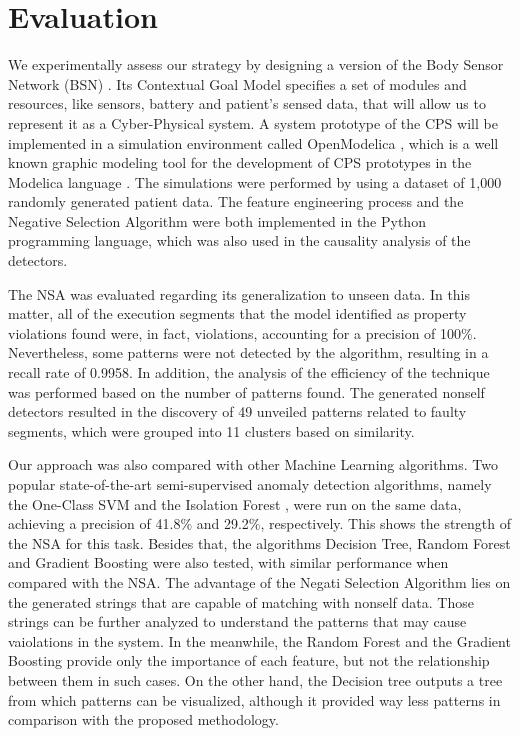 \section{Evaluation}

We experimentally assess our strategy by designing a version of the Body Sensor Network (BSN) \cite{2021BSN}. Its Contextual Goal Model specifies a set of modules and resources, like sensors, battery and patient's sensed data, that will allow us to represent it as a Cyber-Physical system. A system prototype of the CPS will be implemented in a simulation environment called OpenModelica \cite{OpenModelica}, which is a well known graphic modeling tool for the development of CPS prototypes in the Modelica language \cite{Modelica}.
The simulations were performed by using a dataset of 1,000 randomly generated patient data. The feature engineering process and the Negative Selection Algorithm were both implemented in the Python programming language, which was also used in the causality analysis of the detectors.

The NSA was evaluated regarding its generalization to unseen data. In this matter, all of the execution segments that the model identified as property violations found were, in fact, violations, accounting for a precision of 100\%. Nevertheless, some patterns were not detected by the algorithm, resulting in a recall rate of 0.9958. In addition, the analysis of the efficiency of the technique was performed based on the number of patterns found. The generated nonself detectors resulted in the discovery of 49 unveiled patterns related to faulty segments, which were grouped into 11 clusters based on similarity. 

Our approach was also compared with other Machine Learning algorithms. Two popular state-of-the-art semi-supervised anomaly detection algorithms, namely the One-Class SVM and the Isolation Forest \cite{villa2021semi}, were run on the same data, achieving a precision of 41.8\% and 29.2\%, respectively. This shows the strength of the NSA for this task. Besides that, the algorithms Decision Tree, Random Forest and Gradient Boosting \cite{prajwala2015comparative, bentejac2021comparative} were also tested, with similar performance when compared with the NSA. The advantage of the Negati Selection Algorithm lies on the generated strings that are capable of matching with nonself data. Those strings can be further analyzed to understand the patterns that may cause vaiolations in the system. In the meanwhile, the Random Forest and the Gradient Boosting provide only the importance of each feature, but not the relationship between them in such cases. On the other hand, the Decision tree outputs a tree from which patterns can be visualized, although it provided way less patterns in comparison with the proposed methodology.

